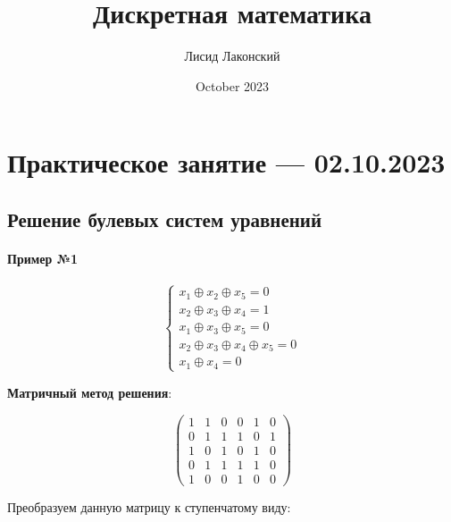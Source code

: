 \documentclass{article}
\title{Дискретная математика}
\author{Лисид Лаконский}
\date{October 2023}
\begin{document}
\raggedright

\maketitle

\tableofcontents
\pagebreak

\section{Практическое занятие — 02.10.2023}

\subsection{Решение булевых систем уравнений}

\paragraph{Пример №1}

\begin{equation}
    \begin{cases}
        x_1 \oplus x_2 \oplus x_5 = 0 \\
        x_2 \oplus x_3 \oplus x_4 = 1 \\
        x_1 \oplus x_3 \oplus x_5 = 0 \\
        x_2 \oplus x_3 \oplus x_4 \oplus x_5 = 0 \\
        x_1 \oplus x_4 = 0
    \end{cases}
\end{equation}

\textbf{Матричный метод решения}:

$$
\begin{pmatrix}
    1 & 1 & 0 & 0 & 1 & 0 \\
    0 & 1 & 1 & 1 & 0 & 1 \\
    1 & 0 & 1 & 0 & 1 & 0 \\
    0 & 1 & 1 & 1 & 1 & 0 \\
    1 & 0 & 0 & 1 & 0 & 0
\end{pmatrix}
$$

Преобразуем данную матрицу к ступенчатому виду:
\end{document}
